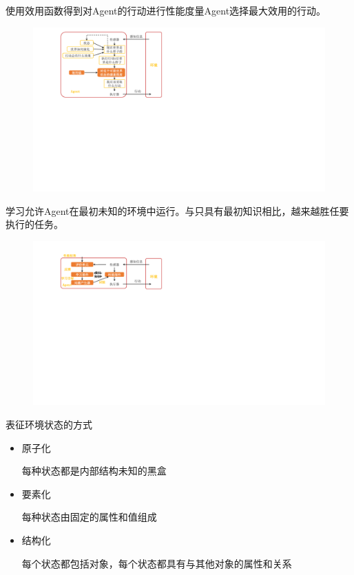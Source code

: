 \begin{definition}[基于效用的Agent]
    使用效用函数得到对Agent的行动进行性能度量Agent选择最大效用的行动。
\end{definition}
\begin{figure}[H]
    \centering
    \includegraphics{image/基于效用的Agent.pdf}
\end{figure}

\begin{definition}[学习Agent]
    学习允许Agent在最初未知的环境中运行。与只具有最初知识相比，越来越胜任要执行的任务。 
\end{definition}
\begin{figure}[htbp]
    \centering
    \includegraphics{image/学习Agent.pdf}
\end{figure}

表征环境状态的方式
\begin{itemize}
    \item 原子化
    
    每种状态都是内部结构未知的黑盒
    \item 要素化
    
    每种状态由固定的属性和值组成
    \item 结构化
    
    每个状态都包括对象，每个状态都具有与其他对象的属性和关系
\end{itemize}

  
  